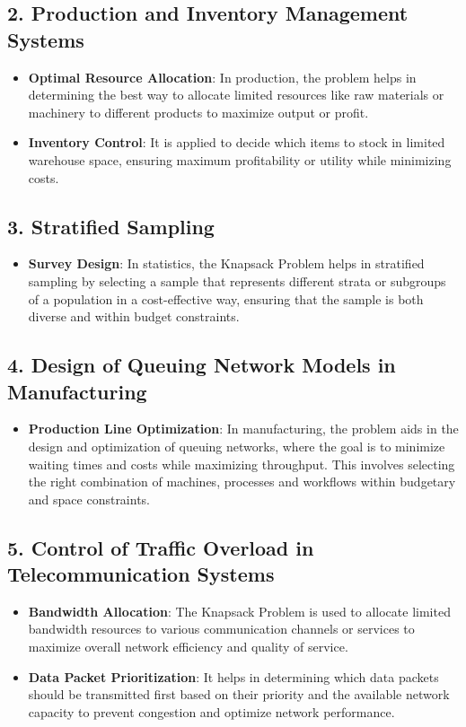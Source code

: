 \documentclass{llncs}
\begin{document}
\subsection*{2. Production and Inventory Management Systems}
\begin{itemize}
    \item \textbf{Optimal Resource Allocation}: In production, the problem helps in
	determining the best way to allocate limited resources like raw materials or machinery
	to different products to maximize output or profit.
    \item \textbf{Inventory Control}: It is applied to decide which items to stock in
	limited warehouse space, ensuring maximum profitability or utility while minimizing costs.
\end{itemize}

\subsection*{3. Stratified Sampling}
\begin{itemize}
    \item \textbf{Survey Design}: In statistics, the Knapsack Problem helps in stratified
	sampling by selecting a sample that represents different strata or subgroups of a population
	in a cost-effective way, ensuring that the sample is both diverse and within budget constraints.
\end{itemize}

\subsection*{4. Design of Queuing Network Models in Manufacturing}
\begin{itemize}
    \item \textbf{Production Line Optimization}: In manufacturing, the problem aids in the design
	and optimization of queuing networks, where the goal is to minimize waiting times and costs
	while maximizing throughput. This involves selecting the right combination of machines, processes
	and workflows within budgetary and space constraints.
\end{itemize}

\subsection*{5. Control of Traffic Overload in Telecommunication Systems}
\begin{itemize}
    \item \textbf{Bandwidth Allocation}: The Knapsack Problem is used to allocate limited bandwidth
	resources to various communication channels or services to maximize overall network efficiency
	and quality of service.
    \item \textbf{Data Packet Prioritization}: It helps in determining which data packets should
	be transmitted first based on their priority and the available network capacity to prevent
	congestion and optimize network performance.
\end{itemize}
\end{document}
